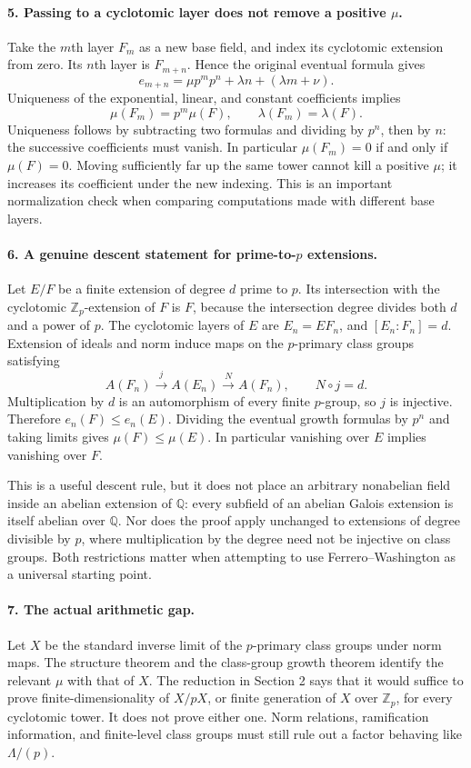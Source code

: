 \documentclass[11pt]{article}
\begin{document}
\paragraph{5. Passing to a cyclotomic layer does not remove a positive $\mu$.}
Take the $m$th layer $F_m$ as a new base field, and index its cyclotomic extension from zero. Its $n$th layer is $F_{m+n}$. Hence the original eventual formula gives
\[
 e_{m+n}=\mu p^m p^n+\lambda n+(\lambda m+\nu).
\]
Uniqueness of the exponential, linear, and constant coefficients implies
\[
 \mu(F_m)=p^m\mu(F),\qquad \lambda(F_m)=\lambda(F).
\]
Uniqueness follows by subtracting two formulas and dividing by $p^n$, then by $n$: the successive coefficients must vanish. In particular $\mu(F_m)=0$ if and only if $\mu(F)=0$. Moving sufficiently far up the same tower cannot kill a positive $\mu$; it increases its coefficient under the new indexing. This is an important normalization check when comparing computations made with different base layers.

\paragraph{6. A genuine descent statement for prime-to-$p$ extensions.}
Let $E/F$ be a finite extension of degree $d$ prime to $p$. Its intersection with the cyclotomic $\mathbb Z_p$-extension of $F$ is $F$, because the intersection degree divides both $d$ and a power of $p$. The cyclotomic layers of $E$ are $E_n=EF_n$, and $[E_n:F_n]=d$. Extension of ideals and norm induce maps on the $p$-primary class groups satisfying
\[
 A(F_n)\xrightarrow{j}A(E_n)\xrightarrow{N}A(F_n),
 \qquad N\circ j=d.
\]
Multiplication by $d$ is an automorphism of every finite $p$-group, so $j$ is injective. Therefore $e_n(F)\leq e_n(E)$. Dividing the eventual growth formulas by $p^n$ and taking limits gives $\mu(F)\leq\mu(E)$. In particular vanishing over $E$ implies vanishing over $F$.

This is a useful descent rule, but it does not place an arbitrary nonabelian field inside an abelian extension of $\mathbb Q$: every subfield of an abelian Galois extension is itself abelian over $\mathbb Q$. Nor does the proof apply unchanged to extensions of degree divisible by $p$, where multiplication by the degree need not be injective on class groups. Both restrictions matter when attempting to use Ferrero--Washington as a universal starting point.

\paragraph{7. The actual arithmetic gap.}
Let $X$ be the standard inverse limit of the $p$-primary class groups under norm maps. The structure theorem and the class-group growth theorem identify the relevant $\mu$ with that of $X$. The reduction in Section 2 says that it would suffice to prove finite-dimensionality of $X/pX$, or finite generation of $X$ over $\mathbb Z_p$, for every cyclotomic tower. It does not prove either one. Norm relations, ramification information, and finite-level class groups must still rule out a factor behaving like $\Lambda/(p)$.
\end{document}
